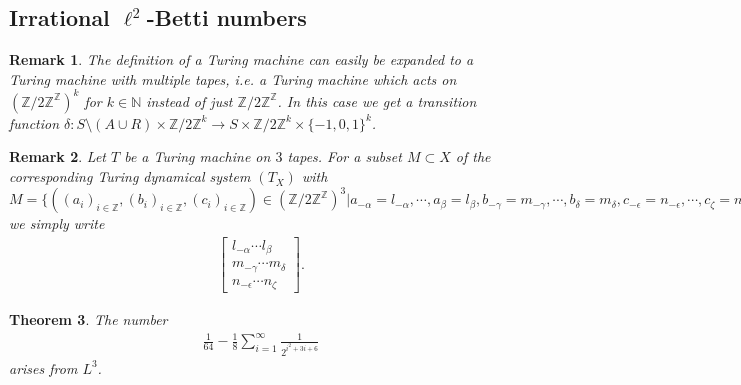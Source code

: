 \documentclass[12pt,a4paper]{scrartcl}
\newtheorem{Theorem}{Theorem}[section]
\newtheorem{Remark}[Theorem]{Remark}
\numberwithin{equation}{section}
\newcommand{\Z}{\mathbb{Z}} %
\newcommand{\N}{\mathbb{N}} %
\newcommand{\2}{\mathbb{Z} / 2 \mathbb{Z}}
\newcommand{\1}{\bar{1}}
\newcommand{\0}{\bar{0}}
\begin{document}
\subsection{Irrational $\ell^2$-Betti numbers}
\begin{Remark}
	The definition of a Turing machine can easily be expanded to a Turing machine with multiple tapes, i.e. a Turing machine which acts on $(\2^\Z)^k$ for $k \in \N$ instead of just $\2^\Z$. In this case we get a transition function $\delta: S \setminus(A \cup R) \times \2^k \to S \times \2^k \times \{-1, 0, 1\}^k$.
\end{Remark}
\begin{Remark}
	Let $T$ be a Turing machine on $3$ tapes. For a subset $M \subset X$ of the corresponding Turing dynamical system $(T_X)$ with $M = \{((a_i)_{i \in \Z}, (b_i)_{i \in \Z}, (c_i)_{i \in \Z}) \in (\2^\Z)^3 | a_{-\alpha} = l_{-\alpha}, \cdots, a_\beta = l_\beta, b_{-\gamma} = m_{-\gamma}, \cdots, b_\delta = m_\delta, c_{-\epsilon} = n_{-\epsilon}, \cdots, c_\zeta = n_\zeta \} \ \alpha, \beta, \gamma, \delta, \epsilon\ \zeta \in \N$ we simply write
	\begin{align*}
		\begin{bmatrix}
			l_{-\alpha} \cdots l_\beta \\
			m_{-\gamma} \cdots m_\delta \\
			n_{-\epsilon} \cdots n_\zeta
		\end{bmatrix}.
	\end{align*}
\end{Remark}
\begin{Theorem}
	The number
	\begin{align*}
		\frac{1}{64} - \frac{1}{8} \sum_{i = 1}^{\infty} \frac{1}{2^{i^2 + 3i + 6}}
	\end{align*}
	arises from $L^3$.
\end{Theorem}
\end{document}
